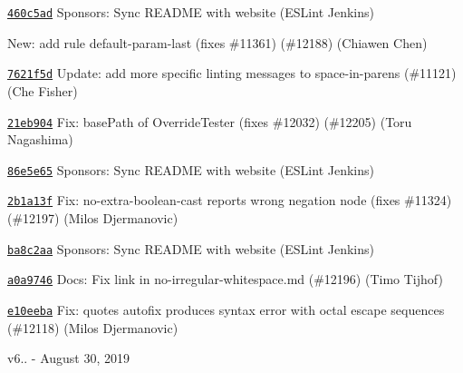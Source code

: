 \begin{DoxyItemize}
\item \href{https://github.com/eslint/eslint/commit/460c5ad176eaf39ff579cd96b3bcbe0539093f8f}{\texttt{ {\ttfamily 460c5ad}}} Sponsors\+: Sync README with website (ESLint Jenkins)
\item \href{https://github.com/eslint/eslint/commit/0313441d016c8aa0674c135f9da67a676e766ec5}{\texttt{ {}}} New\+: add rule default-\/param-\/last (fixes \#11361) (\#12188) (Chiawen Chen)
\item \href{https://github.com/eslint/eslint/commit/7621f5d2aa7d87e798b75ca47d6889c280597e99}{\texttt{ {\ttfamily 7621f5d}}} Update\+: add more specific linting messages to space-\/in-\/parens (\#11121) (Che Fisher)
\item \href{https://github.com/eslint/eslint/commit/21eb9044135c01b6c12188517bba840614483fc6}{\texttt{ {\ttfamily 21eb904}}} Fix\+: base\+Path of Override\+Tester (fixes \#12032) (\#12205) (Toru Nagashima)
\item \href{https://github.com/eslint/eslint/commit/86e5e657ea3fbf12b10524abcbc197afd215a060}{\texttt{ {\ttfamily 86e5e65}}} Sponsors\+: Sync README with website (ESLint Jenkins)
\item \href{https://github.com/eslint/eslint/commit/2b1a13fa0de8360586857f3ced8da514c971297d}{\texttt{ {\ttfamily 2b1a13f}}} Fix\+: no-\/extra-\/boolean-\/cast reports wrong negation node (fixes \#11324) (\#12197) (Milos Djermanovic)
\item \href{https://github.com/eslint/eslint/commit/ba8c2aa0154561fbeca33db0343cb39a7fbd9b4f}{\texttt{ {\ttfamily ba8c2aa}}} Sponsors\+: Sync README with website (ESLint Jenkins)
\item \href{https://github.com/eslint/eslint/commit/a0a9746724ccd22c721ddc1b25c566aa9acea154}{\texttt{ {\ttfamily a0a9746}}} Docs\+: Fix link in no-\/irregular-\/whitespace.\+md (\#12196) (Timo Tijhof)
\item \href{https://github.com/eslint/eslint/commit/e10eebab4abd193dee697c4de7fb2d95bbab2d8c}{\texttt{ {\ttfamily e10eeba}}} Fix\+: quotes autofix produces syntax error with octal escape sequences (\#12118) (Milos Djermanovic)
\end{DoxyItemize}

v6.. -\/ August 30, 2019


